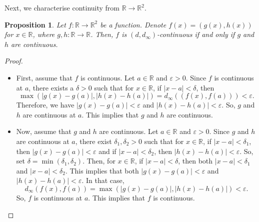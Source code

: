 \documentclass[a4paper, openany]{memoir}
\theoremstyle{definition}
\theoremstyle{plain}
\newtheorem{proposition}[definition]{Proposition}
\begin{document}
Next, we characterise continuity from $\mathbb{R} \to \mathbb{R}^2$.
\begin{proposition}
Let $f: \mathbb{R} \to \mathbb{R}^2$ be a function. Denote $f(x) = (g(x), h(x))$ for $x \in \mathbb{R}$, where $g, h: \mathbb{R} \to \mathbb{R}$. Then, $f$ is $(d, d_\infty)$-continuous if and only if $g$ and $h$ are continuous.
\end{proposition}
\begin{proof}
\hspace*{0pt}
\begin{itemize}
    \item First, assume that $f$ is continuous. Let $a \in \mathbb{R}$ and $\varepsilon > 0$. Since $f$ is continuous at $a$, there exists a $\delta > 0$ such that for $x \in \mathbb{R}$, if $|x - a| < \delta$, then 
    \[\max(|g(x) - g(a)|, |h(x) - h(a)|) = d_\infty((f(x), f(a))) < \varepsilon.\]
    Therefore, we have $|g(x) - g(a)| < \varepsilon$ and $|h(x) - h(a)| < \varepsilon$. So, $g$ and $h$ are continuous at $a$. This implies that $g$ and $h$ are continuous.
    
    \item Now, assume that $g$ and $h$ are continuous. Let $a \in \mathbb{R}$ and $\varepsilon > 0$. Since $g$ and $h$ are continuous at $a$, there exist $\delta_1, \delta_2 > 0$ such that for $x \in \mathbb{R}$, if $|x - a| < \delta_1$, then $|g(x) - g(a)| < \varepsilon$ and if $|x - a| < \delta_2$, then $|h(x) - h(a)| < \varepsilon$. So, set $\delta = \min(\delta_1, \delta_2)$. Then, for $x \in \mathbb{R}$, if $|x - a| < \delta$, then both $|x - a| < \delta_1$ and $|x - a| < \delta_2$. This implies that both $|g(x) - g(a)| < \varepsilon$ and $|h(x) - h(a)| < \varepsilon$. In that case,
    \[d_\infty(f(x), f(a)) = \max(|g(x) - g(a)|, |h(x) - h(a)|) < \varepsilon.\]
    So, $f$ is continuous at $a$. This implies that $f$ is continuous.
\end{itemize}
\end{proof}
\end{document}
